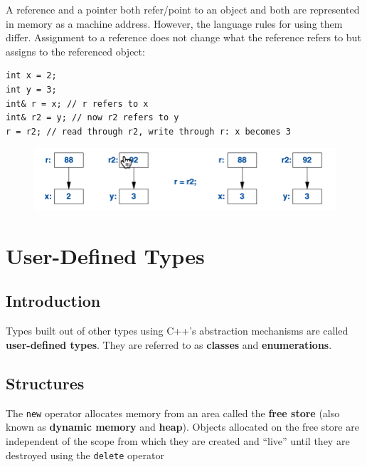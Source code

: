 \documentclass[11pt]{article}
\begin{document}
A reference and a pointer both refer/point to an object and both are represented in memory as a
machine address. However, the language rules for using them differ. Assignment to a reference
does not change what the reference refers to but assigns to the referenced object:
\begin{verbatim}
int x = 2;
int y = 3;
int& r = x; // r refers to x
int& r2 = y; // now r2 refers to y
r = r2; // read through r2, write through r: x becomes 3
\end{verbatim}
\begin{figure}[htbp]
\centering
\includegraphics[width=.6\textwidth]{../images/ATourOfC++/1.png}
\label{}
\end{figure}
\section{User-Defined Types}
\label{sec:org2d1de45}
\subsection{Introduction}
\label{sec:org603a9c1}
Types built out of other types using C++’s abstraction mechanisms are called \textbf{user-defined types}.
They are referred to as \textbf{classes} and \textbf{enumerations}.
\subsection{Structures}
\label{sec:org370d6b0}
The \texttt{new} operator allocates memory from an area called the \textbf{free store} (also known as \textbf{dynamic
memory} and \textbf{heap}). Objects allocated on the free store are independent of the scope from which
they are created and ``live'' until they are destroyed using the \texttt{delete} operator
\end{document}
